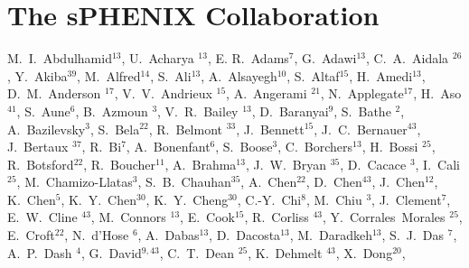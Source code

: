 \documentclass[type=preprint,linenumbering=off]{sphenix}
\begin{document}
\clearpage




\newpage

\appendix

\section*{The sPHENIX Collaboration}

\begin{flushleft} 
\small

M.~I.~Abdulhamid$^{13}$,
U.~Acharya\,\,$^{13}$,
E. R.~Adams$^{7}$,
G.~Adawi$^{13}$,
C.~A.~Aidala\,\,$^{26}$,
Y.~Akiba$^{39}$,
M.~Alfred$^{14}$,
S.~Ali$^{13}$,
A.~Alsayegh$^{10}$,
S.~Altaf$^{15}$,
H.~Amedi$^{13}$,
D.~M.~Anderson\,\,$^{17}$,
V.~V.~Andrieux\,\,$^{15}$,
A.~Angerami\,\,$^{21}$,
N.~Applegate$^{17}$,
H.~Aso$^{41}$,
S.~Aune$^{6}$,
B.~Azmoun\,\,$^{3}$,
V.~R.~Bailey\,\,$^{13}$,
D.~Baranyai$^{9}$,
S.~Bathe\,\,$^{2}$,
A.~Bazilevsky$^{3}$,
S.~Bela$^{22}$,
R.~Belmont\,\,$^{33}$,
J.~Bennett$^{15}$,
J.~C.~Bernauer$^{43}$,
J.~Bertaux\,\,$^{37}$,
R.~Bi$^{7}$,
A.~Bonenfant$^{6}$,
S.~Boose$^{3}$,
C.~Borchers$^{13}$,
H.~Bossi\,\,$^{25}$,
R.~Botsford$^{22}$,
R.~Boucher$^{11}$,
A.~Brahma$^{13}$,
J.~W.~Bryan\,\,$^{35}$,
D.~Cacace\,\,$^{3}$,
I.~Cali$^{25}$,
M.~Chamizo-Llatas$^{3}$,
S.~B.~Chauhan$^{35}$,
A.~Chen$^{22}$,
D.~Chen$^{43}$,
J.~Chen$^{12}$,
K.~Chen$^{5}$,
K.~Y.~Chen$^{30}$,
K.~Y.~Cheng$^{30}$,
C.-Y.~Chi$^{8}$,
M.~Chiu\,\,$^{3}$,
J.~Clement$^{7}$,
E.~W.~Cline\,\,$^{43}$,
M.~Connors\,\,$^{13}$,
E.~Cook$^{15}$,
R.~Corliss\,\,$^{43}$,
Y.~Corrales~Morales\,\,$^{25}$,
E.~Croft$^{22}$,
N.~d'Hose\,\,$^{6}$,
A.~Dabas$^{13}$,
D.~Dacosta$^{13}$,
M.~Daradkeh$^{13}$,
S.~J.~Das\,\,$^{7}$,
A.~P.~Dash\,\,$^{4}$,
G.~David$^{9,43}$,
C.~T.~Dean\,\,$^{25}$,
K.~Dehmelt\,\,$^{43}$,
X.~Dong$^{20}$,

\end{flushleft}
\end{document}
